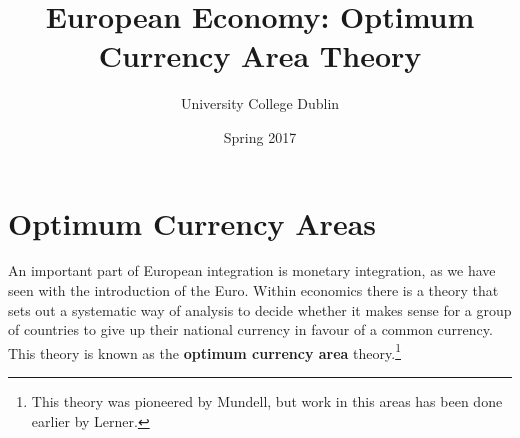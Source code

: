 \documentclass{tufte-handout}
\title{European Economy: Optimum Currency Area Theory}
\author{University College Dublin}
\date{Spring 2017}
\begin{document}
\maketitle  
\section{Optimum Currency Areas}
An important part of European integration is monetary integration, as we have seen with the introduction of the Euro. 
Within economics there is a theory that sets out a systematic way of analysis to decide whether it makes sense for a group of countries to give up their national currency in favour of a common currency. 
This theory is known as the \textbf{optimum currency area} theory.\footnote{This theory was pioneered by Mundell, but work in this areas has been done earlier by Lerner.} 

\end{document}
